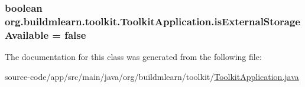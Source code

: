 \subsubsection[{\texorpdfstring{is\+External\+Storage\+Available}{isExternalStorageAvailable}}]{\setlength{\rightskip}{0pt plus 5cm}boolean org.\+buildmlearn.\+toolkit.\+Toolkit\+Application.\+is\+External\+Storage\+Available = false\hspace{0.3cm}{\ttfamily [private]}}\hypertarget{classorg_1_1buildmlearn_1_1toolkit_1_1ToolkitApplication_a44e213cf984150983d557b115fc495e0}{}\label{classorg_1_1buildmlearn_1_1toolkit_1_1ToolkitApplication_a44e213cf984150983d557b115fc495e0}


The documentation for this class was generated from the following file\+:\begin{DoxyCompactItemize}
\item 
source-\/code/app/src/main/java/org/buildmlearn/toolkit/\hyperlink{ToolkitApplication_8java}{Toolkit\+Application.\+java}\end{DoxyCompactItemize}
